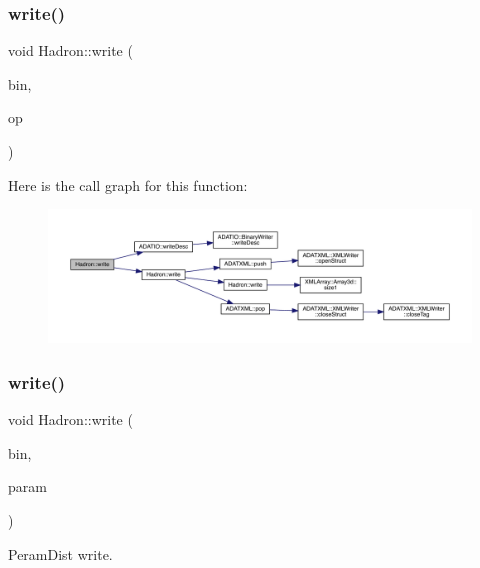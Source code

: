 \subsubsection{\texorpdfstring{write()}{write()}\hspace{0.1cm}{\footnotesize\ttfamily [73/95]}}
{\footnotesize\ttfamily void Hadron\+::write (\begin{DoxyParamCaption}\item[{\mbox{\hyperlink{classADATIO_1_1BinaryWriter}{Binary\+Writer}} \&}]{bin,  }\item[{const \mbox{\hyperlink{structHadron_1_1HadronVertex__t}{Hadron\+Vertex\+\_\+t}} \&}]{op }\end{DoxyParamCaption})}

Here is the call graph for this function\+:\nopagebreak
\begin{figure}[H]
\begin{center}
\leavevmode
\includegraphics[width=350pt]{d1/daf/namespaceHadron_a6d8b26c4e0e11ca4b20e046f2595326e_cgraph}
\end{center}
\end{figure}
\mbox{\label{namespaceHadron_afebbe26d622d0f830042509739bee2da}} 
\subsubsection{\texorpdfstring{write()}{write()}\hspace{0.1cm}{\footnotesize\ttfamily [74/95]}}
{\footnotesize\ttfamily void Hadron\+::write (\begin{DoxyParamCaption}\item[{\mbox{\hyperlink{classADATIO_1_1BinaryWriter}{Binary\+Writer}} \&}]{bin,  }\item[{const \mbox{\hyperlink{structHadron_1_1ValPeramDist__t}{Val\+Peram\+Dist\+\_\+t}} \&}]{param }\end{DoxyParamCaption})}



Peram\+Dist write. 

